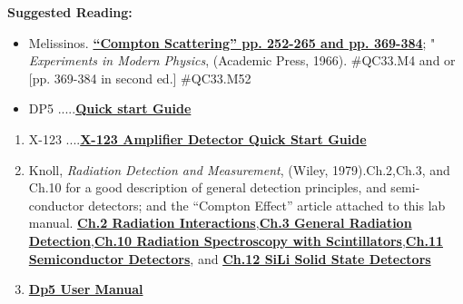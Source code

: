 \documentclass{../lab}
\begin{document}
\textbf{Suggested Reading:}

\begin{itemize}
    \item Melissinos. \href{http://physics111.lib.berkeley.edu/Physics111/Reprints/COM/Melissinos\%201966\%20pg\%20252-265\%20and\%20369-384.pdf}{\textbf{``Compton Scattering'' pp. 252-265 and pp. 369-384}}; " \emph{Experiments in Modern Physics}, (Academic Press, 1966). \#QC33.M4 and or [pp. 369-384 in second ed.] \#QC33.M52

    \item DP5 .....\href{http://experimentationlab.berkeley.edu/sites/default/files/images/DP5\_Quick\_Start-Guide\_B0.pdf}{\textbf{Quick start Guide}}

\end{itemize}

\begin{enumerate}
    \item X-123 ....\href{http://experimentationlab.berkeley.edu/sites/default/files/images/X-123.pdf}{\textbf{X-123 Amplifier Detector Quick Start Guide}}

    \item Knoll, \emph{Radiation Detection and Measurement}, (Wiley, 1979).Ch.2,Ch.3, and Ch.10 for a good description of general detection principles, and semi-conductor detectors; and the ``Compton Effect'' article attached to this lab manual. \href{http://physics111.lib.berkeley.edu/Physics111/Reprints/COM/01-Radiation\_Detection\_and\_Measurement\_CH\_02.pdf}{\textbf{Ch.2 Radiation Interactions}},\href{http://physics111.lib.berkeley.edu/Physics111/Reprints/COM/01-Radiation\_Detection\_and\_Measurement\_CH\_03.pdf}{\textbf{Ch.3 General Radiation Detection}},\href{http://physics111.lib.berkeley.edu/Physics111/Reprints/COM/01-Radiation\_Detection\_and\_Measurement\_CH\_10.pdf}{\textbf{Ch.10 Radiation Spectroscopy with Scintillators}},\href{http://physics111.lib.berkeley.edu/Physics111/Reprints/COM/01-Radiation\_Detection\_and\_Measurement\_CH\_11.pdf}{\textbf{Ch.11 Semiconductor Detectors}}, and \href{http://physics111.lib.berkeley.edu/Physics111/Reprints/COM/Knoll\_ch.\%2012\%20lithium-drifted\%20germanium\%20detectors.pdf}{\textbf{Ch.12 SiLi Solid State Detectors}}

    \item \href{http://experimentationlab.berkeley.edu/sites/default/files/images/DP5\_User\_Manual\_A1.pdf}{\textbf{Dp5 User Manual}}

\end{enumerate}
\end{document}
